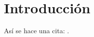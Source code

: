 \documentclass[12pt]{article}
\begin{document}


\section{Introducción}
Así se hace una cita: \cite{Bolotin2017}.


\printbibliography
\end{document}
